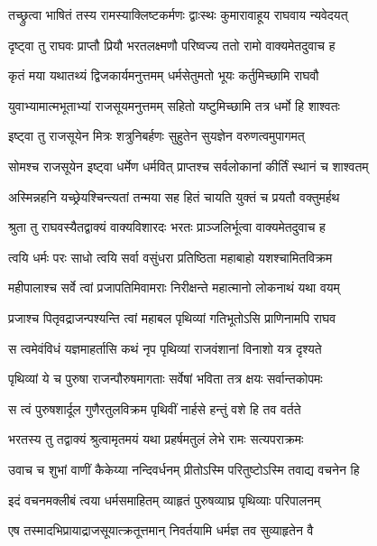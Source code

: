 \twolineshloka
{तच्छ्रुत्वा भाषितं तस्य रामस्याक्लिष्टकर्मणः}
{द्वाःस्थः कुमारावाहूय राघवाय न्यवेदयत्} %

\twolineshloka
{दृष्ट्वा तु राघवः प्राप्तौ प्रियौ भरतलक्ष्मणौ}
{परिष्वज्य ततो रामो वाक्यमेतदुवाच ह} %

\twolineshloka
{कृतं मया यथातथ्यं द्विजकार्यमनुत्तमम्}
{धर्मसेतुमतो भूयः कर्तुमिच्छामि राघवौ} %

\twolineshloka
{युवाभ्यामात्मभूताभ्यां राजसूयमनुत्तमम्}
{सहितो यष्टुमिच्छामि तत्र धर्मो हि शाश्वतः} %

\twolineshloka
{इष्ट्वा तु राजसूयेन मित्रः शत्रुनिबर्हणः}
{सुहुतेन सुयज्ञेन वरुणत्वमुपागमत्} %

\twolineshloka
{सोमश्च राजसूयेन इष्ट्वा धर्मेण धर्मवित्}
{प्राप्तश्च सर्वलोकानां कीर्तिं स्थानं च शाश्वतम्} %

\twolineshloka
{अस्मिन्नहनि यच्छ्रेयश्चिन्त्यतां तन्मया सह}
{हितं चायति युक्तं च प्रयतौ वक्तुमर्हथ} %

\twolineshloka
{श्रुता तु राघवस्यैतद्वाक्यं वाक्यविशारदः}
{भरतः प्राञ्जलिर्भूत्वा वाक्यमेतदुवाच ह} %

\twolineshloka
{त्वयि धर्मः परः साधो त्वयि सर्वा वसुंधरा}
{प्रतिष्ठिता महाबाहो यशश्चामितविक्रम} %

\twolineshloka
{महीपालाश्च सर्वे त्वां प्रजापतिमिवामराः}
{निरीक्षन्ते महात्मानो लोकनाथं यथा वयम्} %

\twolineshloka
{प्रजाश्च पितृवद्राजन्पश्यन्ति त्वां महाबल}
{पृथिव्यां गतिभूतोऽसि प्राणिनामपि राघव} %

\twolineshloka
{स त्वमेवंविधं यज्ञमाहर्तासि कथं नृप}
{पृथिव्यां राजवंशानां विनाशो यत्र दृश्यते} %

\twolineshloka
{पृथिव्यां ये च पुरुषा राजन्पौरुषमागताः}
{सर्वेषां भविता तत्र क्षयः सर्वान्तकोपमः} %

\twolineshloka
{स त्वं पुरुषशार्दूल गुणैरतुलविक्रम}
{पृथिवीं नार्हसे हन्तुं वशे हि तव वर्तते} %

\twolineshloka
{भरतस्य तु तद्वाक्यं श्रुत्वामृतमयं यथा}
{प्रहर्षमतुलं लेभे रामः सत्यपराक्रमः} %

\twolineshloka
{उवाच च शुभां वाणीं कैकेय्या नन्दिवर्धनम्}
{प्रीतोऽस्मि परितुष्टोऽस्मि तवाद्य वचनेन हि} %

\twolineshloka
{इदं वचनमक्लीबं त्वया धर्मसमाहितम्}
{व्याहृतं पुरुषव्याघ्र पृथिव्याः परिपालनम्} %

\twolineshloka
{एष तस्मादभिप्रायाद्राजसूयात्क्रतूत्तमान्}
{निवर्तयामि धर्मज्ञ तव सुव्याहृतेन वै} %

